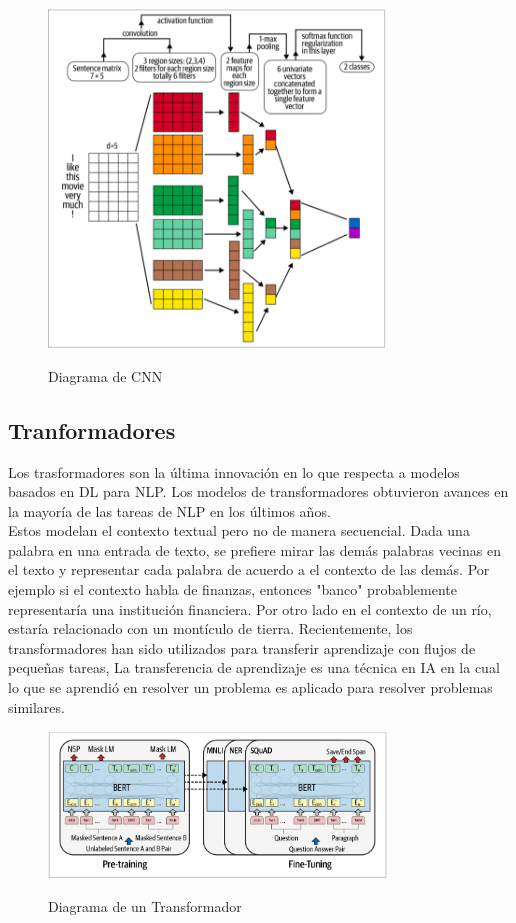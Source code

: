 \begin{figure}[H]
	\centering
	\includegraphics[width=0.8\textwidth]{imagenes/Cap 2/cnn.png}
	\caption{Diagrama de CNN}
	\label{fig:CNN}
	\cite{sowmya_practical_npl}
\end{figure}

\subsection{Tranformadores}

Los trasformadores son la última innovación en lo que respecta a modelos basados en DL para NLP.
Los
modelos de transformadores obtuvieron avances en la mayoría de las tareas de NLP en los últimos
años. \\
Estos modelan el contexto textual pero no de manera secuencial. Dada una palabra en una entrada de
texto, se
prefiere mirar las demás palabras vecinas en el texto y representar cada palabra de acuerdo a el
contexto
de las demás. Por ejemplo si el contexto habla de finanzas, entonces "banco" probablemente
representaría una
institución financiera. Por otro lado en el contexto de un río, estaría relacionado con un
montículo de tierra.
Recientemente, los transformadores han sido utilizados para transferir aprendizaje con flujos de
pequeñas tareas,
La transferencia de aprendizaje es una técnica en IA en la cual lo que se aprendió en resolver un
problema es
aplicado para resolver problemas similares.

\begin{figure}[H]
	\centering
	\includegraphics[width=0.8\textwidth]{imagenes/Cap 2/tranformers.png}
	\caption{Diagrama de un Transformador}
	\label{fig:Transformadores}
	\cite{sowmya_practical_npl}
\end{figure}

